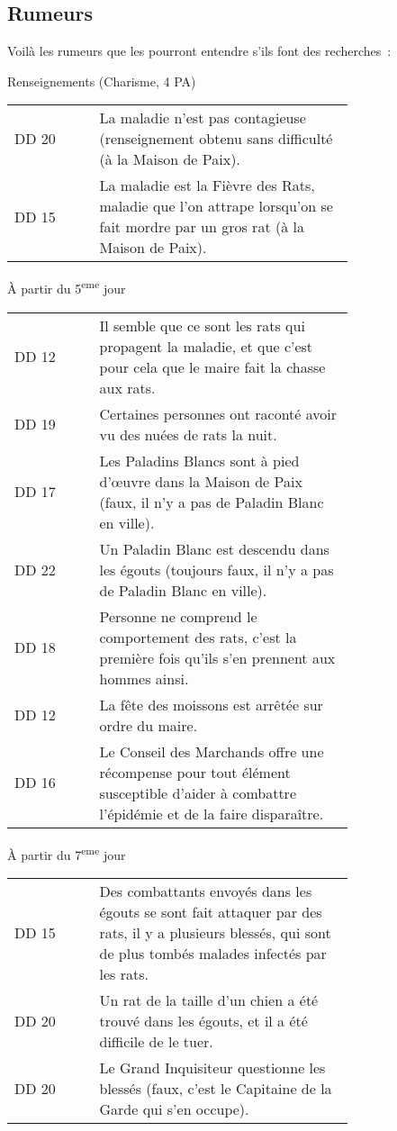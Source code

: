 \documentclass[a4paper,10pt,openany]{book}
\begin{document}
\begin{multicols}{2}
\subsection{Rumeurs}
Voilà les rumeurs que les \PJs pourront entendre s’ils font des recherches :
\begin{quotebox}
	Renseignements (Charisme, 4 PA)\par\noindent
	\begin{tabular}{lp{0.75\linewidth}}
		DD 20 & La maladie n’est pas contagieuse (renseignement obtenu sans difficulté (à la Maison de Paix).\\
		DD 15 & La maladie est la Fièvre des Rats, maladie que l’on attrape lorsqu’on se fait mordre par un gros rat (à la Maison de Paix).
	\end{tabular}\par\noindent
	À partir du 5\textsuperscript{eme} jour\par\noindent
	\begin{tabular}{lp{0.75\linewidth}}
		DD 12 & Il semble que ce sont les rats qui propagent la maladie, et que c’est pour cela que le maire fait la chasse aux rats.\\
		DD 19 & Certaines personnes ont raconté avoir vu des nuées de rats la nuit.\\
		DD 17 & Les Paladins Blancs sont à pied d’œuvre dans la Maison de Paix (faux, il n’y a pas de Paladin Blanc en ville).\\
		DD 22 & Un Paladin Blanc est descendu dans les égouts (toujours faux, il n’y a pas de Paladin Blanc en ville).\\
		DD 18 & Personne ne comprend le comportement des rats, c’est la première fois qu’ils s’en prennent aux hommes ainsi.\\
		DD 12 & La fête des moissons est arrêtée sur ordre du maire.\\
		DD 16 & Le Conseil des Marchands offre une récompense pour tout élément susceptible d’aider à combattre l’épidémie et de la faire disparaître.
	\end{tabular}\par\noindent
	À partir du 7\textsuperscript{eme} jour\par\noindent
	\begin{tabular}{lp{0.75\linewidth}}
		DD 15 & Des combattants envoyés dans les égouts se sont fait attaquer par des rats, il y a plusieurs blessés, qui sont de plus tombés malades
		infectés par les rats.\\
		DD 20 & Un rat de la taille d’un chien a été trouvé dans les égouts, et il a été difficile de le tuer.\\
		DD 20 & Le Grand Inquisiteur questionne les blessés (faux, c’est le Capitaine de la Garde qui s’en occupe).
	\end{tabular}
\end{quotebox}


\end{multicols}
\end{document}
